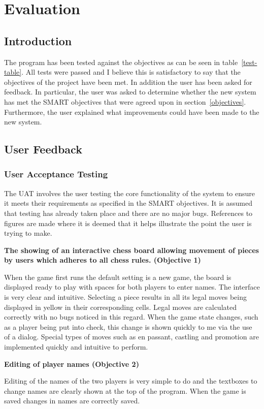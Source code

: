 \chapter{Evaluation}
\section{Introduction}
The program has been tested against the objectives as can be seen in table~\ref{test-table}. All tests were passed and I believe this is satisfactory to say that the objectives of the project have been met.
In addition the user has been asked for feedback. In particular, the user was asked to determine whether the new system has met the SMART objectives that were agreed upon in section~\ref{objectives}. Furthermore, the user explained what improvements could have been made to the new system. 
\section{User Feedback}
\subsection{User Acceptance Testing}
The UAT involves the user testing the core functionality of the system to ensure it meets their requirements as specified in the SMART objectives. It is assumed that testing has already taken place and there are no major bugs. References to figures are made where it is deemed that it helps illustrate the point the user is trying to make.

\textbf{The showing of an interactive chess board allowing movement of pieces by users which adheres to all chess rules. (Objective 1)}

When the game first runs the default setting is a new game, the board is displayed ready to play with spaces for both players to enter names.  The interface is very clear and intuitive.  Selecting a piece results in all its legal moves being displayed in yellow in their corresponding cells. Legal moves are calculated correctly with no bugs noticed in this regard. When the game state changes, such as a player being put into check, this change is shown quickly to me via the use of a dialog. Special types of moves such as en passant, castling and promotion are implemented quickly and intuitive to perform.

\textbf{Editing of player names (Objective 2)}

Editing of the names of the two players is very simple to do and the textboxes to change names are clearly shown at the top of the program. When the game is saved changes in names are correctly saved.


